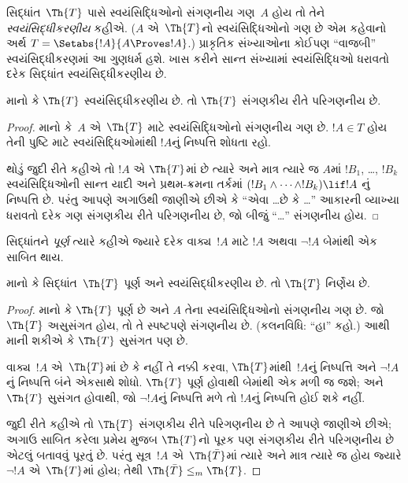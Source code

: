 \label{guunit:OLP-0306}


સિદ્ધાંત~$\Th{T}$ પાસે
સ્વયંસિદ્ધિઓનો સંગણનીય ગણ~$A$
હોય તો તેને
\emph{સ્વયંસિદ્ધીકરણીય} કહીએ.
($A$ એ~$\Th{T}$નો
સ્વયંસિદ્ધિઓનો ગણ છે એમ
કહેવાનો અર્થ
$T = \Setabs{!A}{A \Proves !A}$.)
પ્રાકૃતિક સંખ્યાઓના કોઈપણ
``વાજબી'' સ્વયંસિદ્ધીકરણમાં
આ ગુણધર્મ હશે. ખાસ કરીને
સાન્ત સંખ્યામાં સ્વયંસિદ્ધિઓ
ધરાવતો દરેક સિદ્ધાંત
સ્વયંસિદ્ધીકરણીય છે.

\begin{lem}
માનો કે $\Th{T}$
સ્વયંસિદ્ધીકરણીય છે.
તો $\Th{T}$
સંગણકીય રીતે પરિગણનીય છે.
\end{lem}

\begin{proof}
માનો કે~$A$ એ~$\Th{T}$
માટે સ્વયંસિદ્ધિઓનો
સંગણનીય ગણ છે.
$!A \in T$ હોય તેની
પુષ્ટિ માટે સ્વયંસિદ્ધિઓમાંથી
$!A$નું નિષ્પત્તિ
શોધતા રહો.

થોડું જુદી રીતે કહીએ તો
$!A$ એ $\Th{T}$માં છે
ત્યારે અને માત્ર ત્યારે જ
$A$માં $!B_1$, \dots,
$!B_k$ સ્વયંસિદ્ધિઓની
સાન્ત યાદી અને પ્રથમ-ક્રમના
તર્કમાં
$(!B_1 \land \dots \land !B_k) \lif !A$
નું નિષ્પત્તિ છે.
પરંતુ આપણે અગાઉથી જાણીએ
છીએ કે ``એવા \dots છે કે
\dots'' આકારની વ્યાખ્યા
ધરાવતો દરેક ગણ સંગણકીય રીતે પરિગણનીય
છે, જો બીજું ``\dots''
સંગણનીય હોય.
\end{proof}
\endgroup


\begingroup
\makeatletter{}\makeatother


\label{guunit:OLP-0307}


સિદ્ધાંતને {\em પૂર્ણ} ત્યારે કહીએ
જ્યારે દરેક વાક્ય~$!A$ માટે
$!A$ અથવા $\lnot !A$
બેમાંથી એક સાબિત થાય.

\begin{lem}
માનો કે સિદ્ધાંત~$\Th{T}$
પૂર્ણ અને સ્વયંસિદ્ધીકરણીય છે.
તો $\Th{T}$ નિર્ણેય છે.
\end{lem}

\begin{proof}
માનો કે $\Th{T}$ પૂર્ણ છે
અને $A$ તેના સ્વયંસિદ્ધિઓનો
સંગણનીય ગણ છે.
જો $\Th{T}$ અસુસંગત હોય,
તો તે સ્પષ્ટપણે સંગણનીય છે.
(કલનવિધિ: ``હા'' કહો.)
આથી માની શકીએ કે
$\Th{T}$ સુસંગત પણ છે.

વાક્ય~$!A$ એ~$\Th{T}$માં
છે કે નહીં તે નક્કી કરવા,
$\Th{T}$માંથી~$!A$નું
નિષ્પત્તિ અને
$\lnot !A$નું નિષ્પત્તિ
બંને એકસાથે શોધો.
$\Th{T}$ પૂર્ણ હોવાથી
બેમાંથી એક મળી જ જશે;
અને $\Th{T}$ સુસંગત હોવાથી,
જો $\lnot !A$નું
નિષ્પત્તિ મળે તો
$!A$નું નિષ્પત્તિ
હોઈ શકે નહીં.

જુદી રીતે કહીએ તો
$\Th{T}$ સંગણકીય રીતે પરિગણનીય છે
તે આપણે જાણીએ છીએ;
અગાઉ સાબિત કરેલા પ્રમેય
મુજબ $\Th{T}$નો પૂરક પણ
સંગણકીય રીતે પરિગણનીય છે એટલું
બતાવવું પૂરતું છે.
પરંતુ સૂત્ર~$!A$ એ~$\Th{\bar
T}$માં ત્યારે અને માત્ર
ત્યારે જ હોય જ્યારે
$\lnot !A$ એ~$\Th{T}$માં
હોય; તેથી
$\Th{\bar T} \leq_m
\Th{T}$.
\end{proof}
\endgroup


